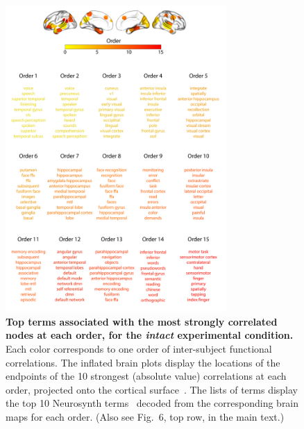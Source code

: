 \documentclass{article}
\newcommand{\neurosynth}{6}
\begin{document}
\begin{figure}[p!]
\centering
\includegraphics[width=0.75\textwidth]{figs/supp_15_intact}
\caption{\textbf{Top terms associated with the most strongly
      correlated nodes at each order, for the \textit{intact} experimental
    condition.}  Each color corresponds to one order of inter-subject
functional correlations. The inflated brain plots display the
locations of the endpoints of the 10 strongest (absolute value)
correlations at each order, projected onto the cortical
surface~\citep{CombEtal19}.  The lists of terms display
the top 10 Neurosynth terms~\citep{RubiEtal17} decoded from the
corresponding brain maps for each order.  (Also see Fig.~\neurosynth,
top row, in the main text.)}
\label{fig:intact}
\end{figure}
\end{document}
